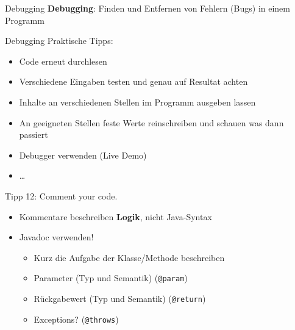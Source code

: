 \documentclass[18pt]{beamer}
\begin{document}
\begin{frame}{Debugging}
    \textbf{Debugging}: Finden und Entfernen von Fehlern (Bugs) in einem Programm
\end{frame}

\begin{frame}{Debugging}
    Praktische Tipps:
    \begin{itemize}
        \item Code erneut durchlesen
        \item Verschiedene Eingaben testen und genau auf Resultat achten
        \item Inhalte an verschiedenen Stellen im Programm ausgeben lassen
        \item An geeigneten Stellen feste Werte reinschreiben und schauen was dann passiert
        \item Debugger verwenden (\alert{Live Demo})
        \item \dots
    \end{itemize}
\end{frame}

\begin{frame}{Tipp 12: Comment your code.}
    \begin{itemize}
        \item Kommentare beschreiben \textbf{Logik}, nicht Java-Syntax
        \item Javadoc verwenden!
        \begin{itemize}
            \item Kurz die Aufgabe der Klasse/Methode beschreiben
            \item Parameter (Typ und Semantik) (\texttt{@param})
            \item Rückgabewert (Typ und Semantik) (\texttt{@return})
            \item Exceptions? (\texttt{@throws})
        \end{itemize}
    \end{itemize}
\end{frame}
\end{document}
